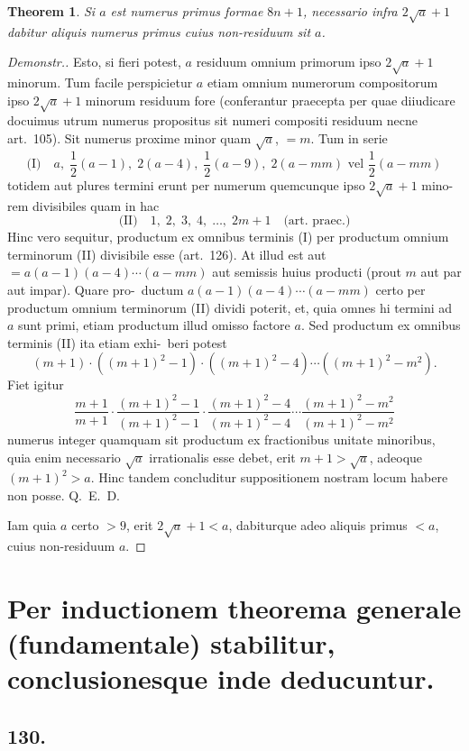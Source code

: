 \documentclass[12pt,a4paper]{article}
\theoremstyle{plain}
\newtheorem{theorem}{Theorem}[section]
\theoremstyle{definition}
\theoremstyle{remark}
\begin{document}
\begin{theorem}
Si $a$ est numerus primus formae $8n+1$, necessario infra $2\sqrt{a}+1$
dabitur aliquis numerus primus cuius non-residuum sit $a$.
\end{theorem}

\begin{proof}[Demonstr.]
Esto, si fieri potest, $a$ residuum omnium primorum ipso $2\sqrt{a}+1$
minorum. Tum facile perspicietur $a$ etiam omnium numerorum compositorum
ipso $2\sqrt{a}+1$ minorum residuum fore (conferantur praecepta per quae diiudicare
docuimus utrum numerus propositus sit numeri compositi residuum necne art.~105). Sit numerus proxime minor quam $\sqrt{a}$, $= m$. Tum in serie
\[
\text{(I)} \quad a,\; \frac{1}{2}(a-1),\; 2(a-4),\; \frac{1}{2}(a-9),\; 2(a-mm) \text{ vel } \frac{1}{2}(a-mm)
\]
totidem aut plures termini erunt per numerum quemcunque ipso $2\sqrt{a}+1$ mino-
rem divisibiles quam in hac
\[
\text{(II)} \quad 1,\; 2,\; 3,\; 4,\; \ldots,\; 2m+1 \quad \text{(art.\ praec.)}
\]
Hinc vero sequitur, productum ex omnibus terminis (I) per productum omnium
terminorum (II) divisibile esse (art.~126). At illud est aut $= a(a-1)(a-4)\cdots(a-mm)$ aut semissis huius producti (prout $m$ aut par aut impar). Quare pro-\ ductum $a(a-1)(a-4)\cdots(a-mm)$ certo per productum omnium terminorum
(II) dividi poterit, et, quia omnes hi termini ad $a$ sunt primi, etiam productum
illud omisso factore $a$. Sed productum ex omnibus terminis (II) ita etiam exhi-\ beri potest
\[
(m+1) \cdot ((m+1)^2-1) \cdot ((m+1)^2-4) \cdots ((m+1)^2-m^2).
\]
Fiet igitur
\[
\frac{m+1}{m+1} \cdot \frac{(m+1)^2-1}{(m+1)^2-1} \cdot \frac{(m+1)^2-4}{(m+1)^2-4} \cdots \frac{(m+1)^2-m^2}{(m+1)^2-m^2}
\]
numerus integer quamquam sit productum ex fractionibus unitate minoribus,
quia enim necessario $\sqrt{a}$ irrationalis esse debet, erit $m+1 > \sqrt{a}$, adeoque
$(m+1)^2 > a$. Hinc tandem concluditur suppositionem nostram locum habere non
posse. Q.~E.~D.

Iam quia $a$ certo $> 9$, erit $2\sqrt{a}+1 < a$, dabiturque adeo aliquis primus
$< a$, cuius non-residuum $a$.
\end{proof}

\section*{Per inductionem theorema generale (fundamentale) stabilitur, conclusionesque inde deducuntur.}

\subsection*{130.}
\end{document}

